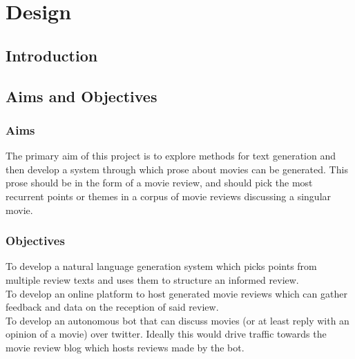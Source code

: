 
\chapter{\label{ch:3-design} Design}


\section{Introduction}

\section{Aims and Objectives}
\subsection{Aims}

The primary aim of this project is to explore methods for text generation and then develop a system through which prose about movies can be generated. This prose should be in the form of a movie review, and should pick the most recurrent points or themes in a corpus of movie reviews discussing a singular movie.

\subsection{Objectives}

To develop a natural language generation system which picks points from multiple review texts and uses them to structure an informed review.\\
To develop an online platform to host generated movie reviews which can gather feedback and data on the reception of said review.\\
To develop an autonomous bot that can discuss movies (or at least reply with an opinion of a movie) over twitter. Ideally this would drive traffic towards the movie review blog which hosts reviews made by the bot.